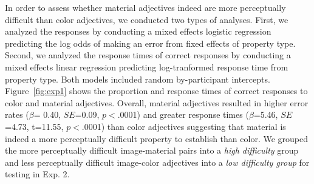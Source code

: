 \documentclass[12pt,letterpaper]{article}
\begin{document}
In order to assess whether material adjectives indeed are more perceptually difficult than color adjectives, we conducted two types of analyses. First, we analyzed the responses by conducting a mixed effects logistic regression predicting the log odds of making an error from fixed effects of property type. Second, we analyzed the response times of correct responses by conducting a mixed effects linear regression predicting log-tranformed response time from property type. Both models included random by-participant intercepts. Figure~\ref{fig:exp1} shows the proportion and response times of correct responses to color and material adjectives. Overall, material adjectives resulted in higher error rates ($\beta$= 0.40, $SE$=0.09, $p$$<$.0001) and greater response times ($\beta$=5.46, $SE$=4.73, t=11.55, $p$$<$.0001) than color adjectives suggesting that material is indeed a more perceptually difficult property to establish than color. We grouped the more perceptually difficult image-material pairs into a \textit{high difficulty} group and less perceptually difficult image-color adjectives into a \textit{low difficulty group} for testing in Exp. 2.
\end{document}
